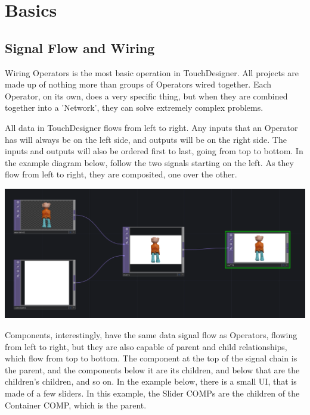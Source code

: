 \cleardoublepage
\chapter{Basics}
\label{ch:1}


\section{Signal Flow and Wiring}

\begin{fullwidth}
Wiring Operators is the most basic operation in TouchDesigner. All projects are made up of nothing more than groups of Operators wired together. Each Operator, on its own, does a very specific thing, but when they are combined together into a 'Network', they can solve extremely complex problems.

All data in TouchDesigner flows from left to right. Any inputs that an Operator has will always be on the left side, and outputs will be on the right side. The inputs and outputs will also be ordered first to last, going from top to bottom. In the example diagram below, follow the two signals starting on the left. As they flow from left to right, they are composited, one over the other.

\begin{center} 
\includegraphics{./img/1.1/signal-flow-1.png}
\end{center}

Components, interestingly, have the same data signal flow as Operators, flowing from left to right, but they are also capable of parent and child relationships, which flow from top to bottom. The component at the top of the signal chain is the parent, and the components below it are its children, and below that are the children's children, and so on. In the example below, there is a small UI, that is made of a few sliders. In this example, the Slider COMPs are the children of the Container COMP, which is the parent.


\end{fullwidth}
